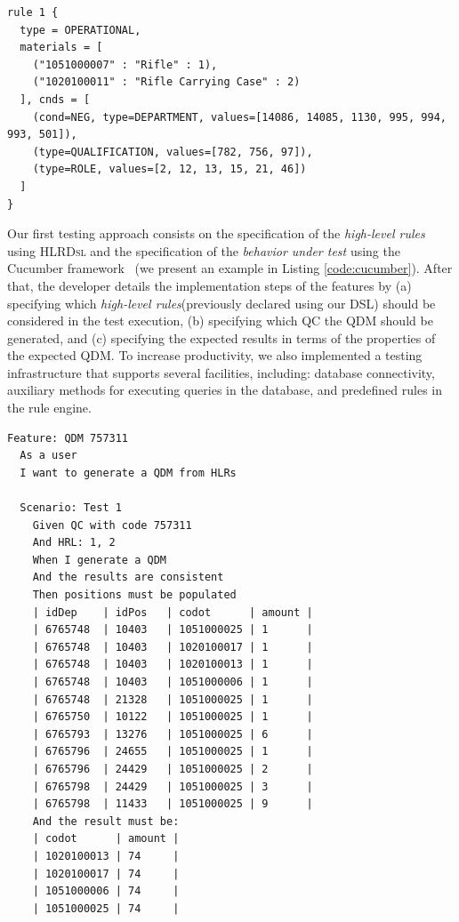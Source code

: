 \documentclass[twocolumn]{bmcart}%
\newcommand{\callers}{\emph{high-level rules}\xspace}
\newcommand{\shc}{HLR\xspace}
\newcommand{\hlrdsl}{\textsc{HLRDsl}\xspace}
\begin{document}
\begin{small}
	\begin{lstlisting}[frame=single, language=DSL, caption={\it Example of a \shc declaration using our DSL}, label={code:dslExample}]
rule 1 { 
  type = OPERATIONAL, 
  materials = [ 
    ("1051000007" : "Rifle" : 1), 
    ("1020100011" : "Rifle Carrying Case" : 2)
  ], cnds = [ 
    (cond=NEG, type=DEPARTMENT, values=[14086, 14085, 1130, 995, 994, 993, 501]),
    (type=QUALIFICATION, values=[782, 756, 97]), 
    (type=ROLE, values=[2, 12, 13, 15, 21, 46])
  ]
}
	\end{lstlisting}
\end{small}

Our first testing approach consists on the specification of the \callers using \hlrdsl and the specification of the
\emph{behavior under test} using the Cucumber framework~\cite{wynne2017cucumber} (we present an example in Listing \ref{code:cucumber}).
After that, the developer details the implementation steps of the features by (a) specifying which
\callers (previously declared using our DSL) should be considered in the test execution, (b) specifying
which QC the QDM should be generated, and (c) specifying the expected results in terms of the properties
of the expected QDM. To increase productivity, we also implemented a testing  infrastructure that supports several facilities,
including: database connectivity, auxiliary methods for executing queries in the database, and predefined
rules in the rule engine.



\begin{lstlisting}[frame=single, language=Cucumber, caption={\it Cucumber feature}, label={code:cucumber}]
Feature: QDM 757311
  As a user
  I want to generate a QDM from HLRs

  Scenario: Test 1
    Given QC with code 757311
    And HRL: 1, 2
    When I generate a QDM
    And the results are consistent
    Then positions must be populated
    | idDep    | idPos   | codot      | amount |
    | 6765748  | 10403   | 1051000025 | 1      |
    | 6765748  | 10403   | 1020100017 | 1      |
    | 6765748  | 10403   | 1020100013 | 1      |
    | 6765748  | 10403   | 1051000006 | 1      |
    | 6765748  | 21328   | 1051000025 | 1      |
    | 6765750  | 10122   | 1051000025 | 1      |    
    | 6765793  | 13276   | 1051000025 | 6      |
    | 6765796  | 24655   | 1051000025 | 1      |
    | 6765796  | 24429   | 1051000025 | 2      |
    | 6765798  | 24429   | 1051000025 | 3      |
    | 6765798  | 11433   | 1051000025 | 9      |   
    And the result must be:
    | codot      | amount |
    | 1020100013 | 74     |
    | 1020100017 | 74     |
    | 1051000006 | 74     |
    | 1051000025 | 74     |
\end{lstlisting}
\end{document}
